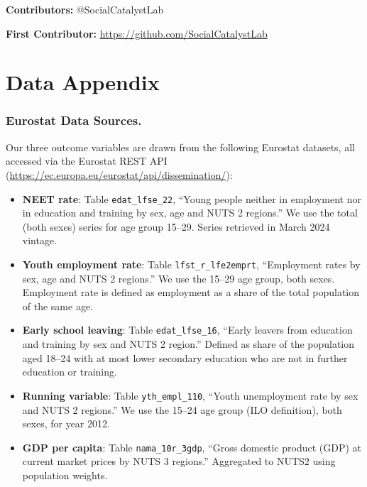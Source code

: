 \documentclass[12pt]{article}
\begin{document}
\noindent\textbf{Contributors:} @SocialCatalystLab

\noindent\textbf{First Contributor:} \url{https://github.com/SocialCatalystLab}

\label{apep_main_text_end}
\newpage


\newpage
\appendix

\section{Data Appendix}
\label{sec:appA}

\subsubsection*{Eurostat Data Sources.} Our three outcome variables are drawn from the following Eurostat datasets, all accessed via the Eurostat REST API (\url{https://ec.europa.eu/eurostat/api/dissemination/}):

\begin{itemize}
\item \textbf{NEET rate}: Table \texttt{edat\_lfse\_22}, ``Young people neither in employment nor in education and training by sex, age and NUTS 2 regions.'' We use the total (both sexes) series for age group 15--29. Series retrieved in March 2024 vintage.

\item \textbf{Youth employment rate}: Table \texttt{lfst\_r\_lfe2emprt}, ``Employment rates by sex, age and NUTS 2 regions.'' We use the 15--29 age group, both sexes. Employment rate is defined as employment as a share of the total population of the same age.

\item \textbf{Early school leaving}: Table \texttt{edat\_lfse\_16}, ``Early leavers from education and training by sex and NUTS 2 region.'' Defined as share of the population aged 18--24 with at most lower secondary education who are not in further education or training.

\item \textbf{Running variable}: Table \texttt{yth\_empl\_110}, ``Youth unemployment rate by sex and NUTS 2 regions.'' We use the 15--24 age group (ILO definition), both sexes, for year 2012.

\item \textbf{GDP per capita}: Table \texttt{nama\_10r\_3gdp}, ``Gross domestic product (GDP) at current market prices by NUTS 3 regions.'' Aggregated to NUTS2 using population weights.
\end{itemize}
\end{document}
